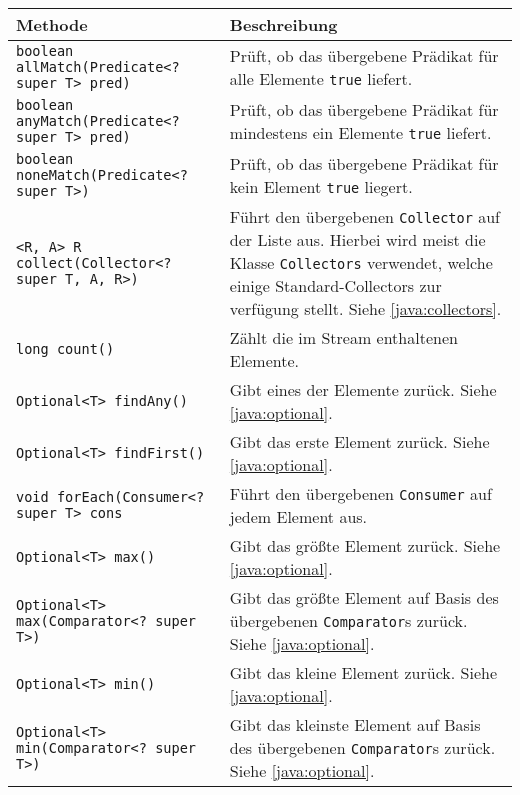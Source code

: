 \documentclass[a4paper, 11pt, accentcolor = tud3b]{tudreport}
\begin{document}
                \begin{sidewaystable}
                    \centering
                    \begin{tabular}{p{8cm} | p{13cm}}
                        Methode & Beschreibung \\
                        \hline
                        \texttt{boolean allMatch(Predicate<? super T> pred)} & Prüft, ob das übergebene Prädikat für alle Elemente \texttt{true} liefert. \\
                        \texttt{boolean anyMatch(Predicate<? super T> pred)} & Prüft, ob das übergebene Prädikat für mindestens ein Elemente \texttt{true} liefert. \\
                        \texttt{boolean noneMatch(Predicate<? super T>)} & Prüft, ob das übergebene Prädikat für kein Element \texttt{true} liegert. \\
                        \texttt{<R, A> R collect(Collector<? super T, A, R>)} & Führt den übergebenen \texttt{Collector} auf der Liste aus. Hierbei wird meist die Klasse \texttt{Collectors} verwendet, welche einige Standard-Collectors zur verfügung stellt. Siehe \ref{java:collectors}. \\
                        \texttt{long count()} & Zählt die im Stream enthaltenen Elemente. \\
                        \texttt{Optional<T> findAny()} & Gibt eines der Elemente zurück. Siehe \ref{java:optional}. \\
                        \texttt{Optional<T> findFirst()} & Gibt das erste Element zurück. Siehe \ref{java:optional}. \\
                        \texttt{void forEach(Consumer<? super T> cons} & Führt den übergebenen \texttt{Consumer} auf jedem Element aus. \\
                        \texttt{Optional<T> max()} & Gibt das größte Element zurück. Siehe \ref{java:optional}. \\
                        \texttt{Optional<T> max(Comparator<? super T>)} & Gibt das größte Element auf Basis des übergebenen \texttt{Comparator}s zurück. Siehe \ref{java:optional}. \\
                        \texttt{Optional<T> min()} & Gibt das kleine Element zurück. Siehe \ref{java:optional}. \\
                        \texttt{Optional<T> min(Comparator<? super T>)} & Gibt das kleinste Element auf Basis des übergebenen \texttt{Comparator}s zurück. Siehe \ref{java:optional}. \\

\end{tabular}
\end{sidewaystable}
\end{document}
